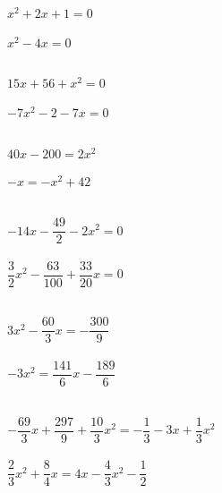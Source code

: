 \documentclass[11pt]{article}
\begin{document}
\begin{exercice}
\begin{multicols}{2}
  $x^2+2x+1=0$  \\ \\ \encart{3cm}
  $x^2-4x=0$ \\ \\ \encart{3cm}
\end{multicols}
\end{exercice}

\begin{exercice}
\begin{multicols}{2}
$15x+56+x^2=0$ \\ \\ \encart{3cm}
$-7x^2-2-7x=0$ \\ \\ \encart{3cm}
\end{multicols}
\end{exercice}

\newpage

\begin{exercice}
\begin{multicols}{2}
$40x-200=2x^2$ \\ \\ \encart{3cm}
$-x=-x^2+42$ \\ \\ \encart{3cm}
\end{multicols}
\end{exercice}

\begin{exercice}
\begin{multicols}{2}
$-14x-\dfrac{49}{2}-2x^2=0$ \\ \\ \encart{3cm}
$\dfrac{3}{2}x^2-\dfrac{63}{100}+\dfrac{33}{20}x=0$ \\ \\ \encart{3cm}
\end{multicols}
\end{exercice}

\begin{exercice}
\begin{multicols}{2}
$3x^2-\dfrac{60}{3}x=-\dfrac{300}{9}$ \\ \\ \encart{3cm}
$-3x^2=\dfrac{141}{6}x-\dfrac{189}{6}$ \\ \\ \encart{3cm}
\end{multicols}
\end{exercice}

\begin{exercice}
\begin{multicols}{2}
 $-\dfrac{69}{3}x+\dfrac{297}{9}+\dfrac{10}{3}x^2=-\dfrac{1}{3}-3x+\dfrac{1}{3}x^2$ \\ \\ \encart{3cm}
  $\dfrac{2}{3}x^2+\dfrac{8}{4}x=4x-\dfrac{4}{3}x^2-\dfrac{1}{2}$ \\ \\ \encart{3cm}
\end{multicols}
\end{exercice}
\end{document}
